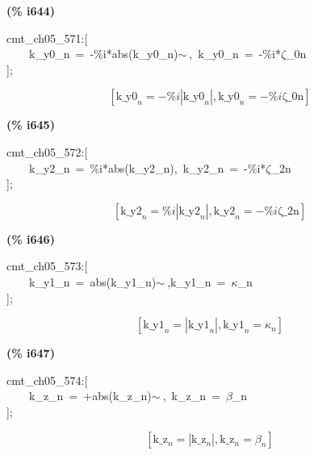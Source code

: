 \documentclass[fleqn]{article}
\begin{document}
\noindent
\begin{minipage}[t]{4.000000em}\color{red}\bfseries
(\% i644)	
\end{minipage}
\begin{minipage}[t]{\textwidth}\color{blue}
cmt\_ch05\_571:[\\
\ \ \ \ k\_y0\_n\ =\ -\%i*abs(k\_y0\_n)\ensuremath{\sim\ },\ k\_y0\_n\ =\ -\%i*\ensuremath{\zeta}\_0n\\
];
\end{minipage}
\[\displaystyle \tag{\% o644} 
\left[ {{\ensuremath{\mathrm{k\_ y0}}}_n}=-\% i \left| {{\ensuremath{\mathrm{k\_ y0}}}_n}\right| \operatorname{,}{{\ensuremath{\mathrm{k\_ y0}}}_n}=-\% i \ensuremath{\mathrm{\zeta \_ 0n}}\right] \mbox{}
\]


\noindent
\begin{minipage}[t]{4.000000em}\color{red}\bfseries
(\% i645)	
\end{minipage}
\begin{minipage}[t]{\textwidth}\color{blue}
cmt\_ch05\_572:[\\
\ \ \ \ k\_y2\_n\ =\ \%i*abs(k\_y2\_n),\ k\_y2\_n\ =\ -\%i*\ensuremath{\zeta}\_2n\\
];
\end{minipage}
\[\displaystyle \tag{\% o645} 
\left[ {{\ensuremath{\mathrm{k\_ y2}}}_n}=\% i \left| {{\ensuremath{\mathrm{k\_ y2}}}_n}\right| \operatorname{,}{{\ensuremath{\mathrm{k\_ y2}}}_n}=-\% i \ensuremath{\mathrm{\zeta \_ 2n}}\right] \mbox{}
\]


\noindent
\begin{minipage}[t]{4.000000em}\color{red}\bfseries
(\% i646)	
\end{minipage}
\begin{minipage}[t]{\textwidth}\color{blue}
cmt\_ch05\_573:[\\
\ \ \ \ k\_y1\_n\ =\ abs(k\_y1\_n)\ensuremath{\sim\ },k\_y1\_n\ =\ \ensuremath{\kappa}\_n\\
];
\end{minipage}
\[\displaystyle \tag{\% o646} 
\left[ {{\ensuremath{\mathrm{k\_ y1}}}_n}=\left| {{\ensuremath{\mathrm{k\_ y1}}}_n}\right| \operatorname{,}{{\ensuremath{\mathrm{k\_ y1}}}_n}={{\kappa }_n}\right] \mbox{}
\]


\noindent
\begin{minipage}[t]{4.000000em}\color{red}\bfseries
(\% i647)	
\end{minipage}
\begin{minipage}[t]{\textwidth}\color{blue}
cmt\_ch05\_574:[\\
\ \ \ \ k\_z\_n\ =\ +abs(k\_z\_n)\ensuremath{\sim\ },\ k\_z\_n\ =\ \ensuremath{\beta}\_n\\
];
\end{minipage}
\[\displaystyle \tag{\% o647} 
\left[ {{\ensuremath{\mathrm{k\_ z}}}_n}=\left| {{\ensuremath{\mathrm{k\_ z}}}_n}\right| \operatorname{,}{{\ensuremath{\mathrm{k\_ z}}}_n}={{\beta }_n}\right] \mbox{}
\]
\end{document}
